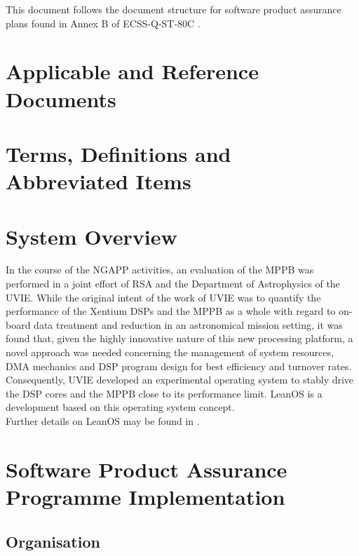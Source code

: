 \noindent
This document follows the document structure for software product assurance
plans found in Annex B of ECSS-Q-ST-80C \cite{ECSS80C}.


\chapter{Applicable and Reference Documents} %

\printbibliography[heading=none]


\chapter{Terms, Definitions and Abbreviated Items}
\printglossary[type=acronym]
\printglossary[type=main, style=altlist]


\chapter{System Overview}

In the course of the \gls{NGAPP} activities, an evaluation of the \gls{MPPB}
was performed in a joint effort of \gls{RSA} and the Department of Astrophysics
of the \gls{UVIE}. While the original intent of the work of \gls{UVIE} was to
quantify the performance of the \gls{Xentium} \glspl{DSP} and the \gls{MPPB} as a
whole with regard to on-board data treatment and reduction in an astronomical
mission setting, it was found that, given the highly innovative nature of this new
processing platform, a novel approach was needed concerning the management of
system resources, \gls{DMA} mechanics and \gls{DSP} program design for best
efficiency and turnover rates. Consequently, \gls{UVIE} developed an experimental
operating system to stably drive the \gls{DSP} cores and the \gls{MPPB} close
to its performance limit. LeanOS is a development based on this operating system
concept.\\

\noindent
Further details on LeanOS may be found in \cite{ssdpOS}.


\chapter{Software Product Assurance Programme Implementation}

\section{Organisation}

